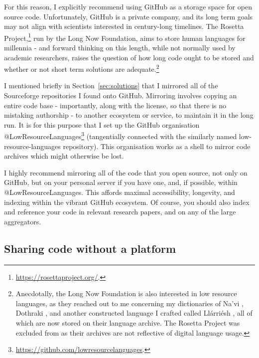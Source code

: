 For this reason, I explicitly recommend using GitHub as a storage space for open source code. Unfortunately, GitHub is a private company, and its long term goals may not align with scientists interested in century-long timelines. The Rosetta Project,\footnote{\href{https://rosettaproject.org/}{https://rosettaproject.org/}. } run by the Long Now Foundation, aims to store human languages for millennia - and forward thinking on this length, while not normally used by academic researchers, raises the question of how long code ought to be stored and whether or not short term solutions are adequate.\footnote{Anecdotally, the Long Now Foundation is also interested in low resource languages, as they reached out to me concerning my dictionaries of Na'vi \citep{navidictionary}, Dothraki \citep{dothrakidictionary}, and another constructed language I crafted called Ll\'arri\'esh \citep{littauerllarriesh}, all of which are now stored on their language archive. The Rosetta Project was excluded from \citet{kornai2013digital} as their archives are not reflective of digital language usage.}

I mentioned briefly in Section~\ref{sec:solutions} that I mirrored all of the Sourceforge repositories I found onto GitHub. Mirroring involves copying an entire code base - importantly, along with the license, so that there is no mistaking authorship - to another ecosystem or service, to maintain it in the long run. It is for this purpose that I set up the GitHub organisation @LowResourceLanguages\footnote{\href{https://github.com/lowresourcelanguages}{https://github.com/lowresourcelanguages}. } (tangentially connected with the similarly named low-resource-languages repository). This organisation works as a shell to mirror code archives which might otherwise be lost.

I highly recommend mirroring all of the code that you open source, not only on GitHub, but on your personal server if you have one, and, if possible, within @LowResourceLanguages. This affords maximal accessibility, longevity, and indexing within the vibrant GitHub ecosystem. Of course, you should also index and reference your code in relevant research papers, and on any of the large aggregators.

\subsection{Sharing code without a platform}
\label{subsec:sharing-code-without-a-platform}

